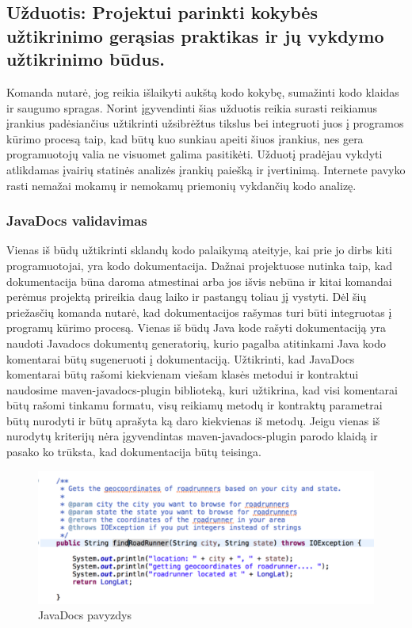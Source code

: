 \documentclass{VUMIFPSkursinis}
\begin{document}
		


	\subsection{Užduotis: Projektui parinkti kokybės užtikrinimo gerąsias praktikas ir jų vykdymo užtikrinimo būdus.}
		Komanda nutarė, jog reikia išlaikyti aukštą kodo kokybę, sumažinti kodo klaidas ir saugumo spragas.
		Norint įgyvendinti šias užduotis reikia surasti reikiamus įrankius padėsiančius užtikrinti užsibrėžtus tikslus bei integruoti juos į programos kūrimo
		procesą taip, kad būtų kuo sunkiau apeiti šiuos įrankius, nes gera programuotojų valia ne visuomet galima pasitikėti.
		Užduotį pradėjau vykdyti atlikdamas įvairių statinės analizės įrankių paiešką ir įvertinimą.
		Internete pavyko rasti nemažai mokamų ir nemokamų priemonių vykdančių kodo analizę.
		
		\subsubsection{JavaDocs validavimas}
			Vienas iš būdų užtikrinti sklandų kodo palaikymą ateityje, kai prie jo dirbs kiti programuotojai, yra kodo dokumentacija.
			Dažnai projektuose nutinka taip, kad dokumentacija būna daroma atmestinai arba jos išvis nebūna ir kitai komandai perėmus projektą prireikia daug 
			laiko ir pastangų toliau jį vystyti.
			Dėl šių priežasčių komanda nutarė, kad dokumentacijos rašymas turi būti integruotas į programų kūrimo procesą.
			Vienas iš būdų Java kode rašyti dokumentaciją yra naudoti Javadocs dokumentų generatorių, kurio pagalba atitinkami Java kodo komentarai būtų 
			sugeneruoti į dokumentaciją. 
			Užtikrinti, kad JavaDocs komentarai būtų rašomi kiekvienam viešam klasės metodui ir kontraktui naudosime maven-javadocs-plugin biblioteką, kuri užtikrina, kad visi komentarai būtų rašomi tinkamu formatu, visų reikiamų metodų ir kontraktų parametrai būtų nurodyti ir būtų aprašyta ką daro kiekvienas iš metodų.
			Jeigu vienas iš nurodytų kriterijų nėra įgyvendintas maven-javadocs-plugin parodo klaidą ir pasako ko trūksta, kad dokumentacija būtų teisinga.
			\begin{figure}[H]
			\includegraphics[scale=1]{img/four}
			\caption{JavaDocs pavyzdys} %
			\label{img:kurimoProcesas}
			\end{figure}
\end{document}
